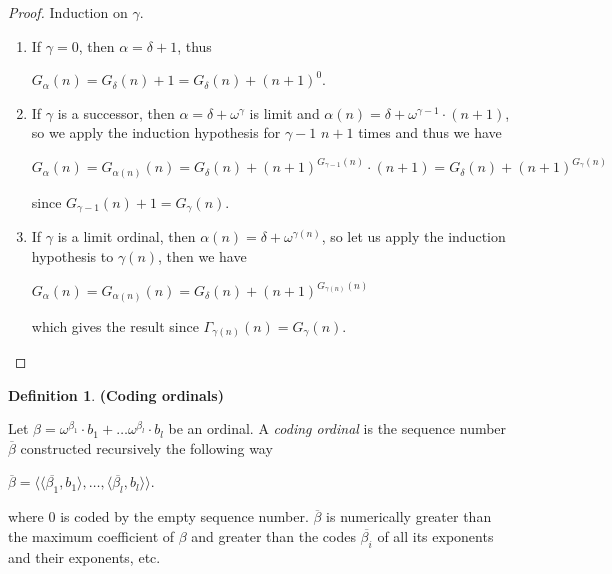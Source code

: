 \documentclass[8pt]{article}
\theoremstyle{definition}
\newtheorem{definition}{Definition}[section]
\theoremstyle{definition}
\theoremstyle{definition}
\theoremstyle{definition}
\theoremstyle{definition}
\theoremstyle{definition}
\theoremstyle{definition}
\theoremstyle{definition}
\theoremstyle{definition}
\theoremstyle{definition}
\theoremstyle{definition}
\theoremstyle{definition}
\theoremstyle{definition}
\theoremstyle{question}
\begin{document}
\begin{proof}
  Induction on $\gamma$.

  \begin{enumerate}
    \item If $\gamma = 0$, then $\alpha = \delta + 1$, thus
    \begin{center}
      $G_{\alpha}(n) = G_{\delta}(n) + 1 =  G_{\delta}(n) + (n + 1)^0$.
    \end{center}
    \item If $\gamma$ is a successor, then $\alpha = \delta + \omega^{\gamma}$ is limit
    and $\alpha(n) = \delta + \omega^{\gamma - 1} \cdot (n + 1)$, so
    we apply the induction hypothesis for $\gamma - 1$ $n + 1$ times and thus we have
    \begin{center}
      $G_{\alpha}(n) = G_{\alpha(n)}(n) = G_{\delta}(n) + (n + 1)^{G_{\gamma - 1}(n)} \cdot (n + 1) = G_{\delta}(n) + (n + 1)^{G_{\gamma}(n)}$
    \end{center}
    since $G_{\gamma - 1}(n) + 1 = G_{\gamma}(n)$.
    \item If $\gamma$ is a limit ordinal, then $\alpha(n) = \delta + \omega^{\gamma(n)}$, 
    so let us apply the induction hypothesis to $\gamma(n)$, then we have
    \begin{center}
      $G_{\alpha}(n) = G_{\alpha(n)}(n) = G_{\delta}(n) + (n + 1)^{G_{\gamma(n)}(n)}$
    \end{center}
    which gives the result since $\Gamma_{\gamma(n)}(n) = G_{\gamma}(n)$.
  \end{enumerate}
\end{proof}

\begin{definition} {\bf (Coding ordinals)}

  Let $\beta = \omega^{\beta_1} \cdot b_1 + \dots \omega^{\beta_l} \cdot b_l$ be an ordinal.
  A \emph{coding ordinal} is the sequence number $\overline{\beta}$ constructed recursively the following way
  \begin{center}
    $\overline{\beta} = \langle \langle \overline{\beta_1}, b_1 \rangle, \dots, \langle \overline{\beta_l}, b_l \rangle \rangle$.
  \end{center}
\end{definition}
where $0$ is coded by the empty sequence number. $\overline{\beta}$ is numerically greater than the maximum
coefficient of $\beta$ and greater than the codes $\overline{\beta_i}$ of all its exponents and their exponents, etc.
\end{document}
